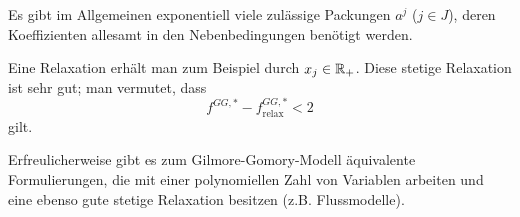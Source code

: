\begin{description}
	Es gibt im Allgemeinen exponentiell viele zulässige Packungen $a^j$ ($j \in J$), deren Koeffizienten allesamt in den Nebenbedingungen benötigt werden.
	
	Eine Relaxation erhält man zum Beispiel durch $x_j \in \mathbb{R}_+$. Diese stetige Relaxation ist sehr gut; man vermutet, dass 
	\begin{equation*}
		f^{GG, \ast} - f^{GG, \ast}_\text{relax} < 2
	\end{equation*}
	gilt.
\end{description}

Erfreulicherweise gibt es zum Gilmore-Gomory-Modell äquivalente Formulierungen, die mit einer polynomiellen Zahl von Variablen arbeiten und eine ebenso gute stetige Relaxation besitzen (z.B. Flussmodelle).